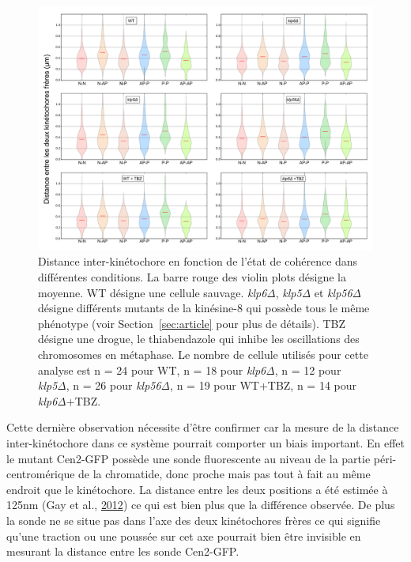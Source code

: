 \documentclass[12pt,a4paper,twoside,openright]{book}
\begin{document}
\begin{figure}[htbp]
\centering
\includegraphics{figures/results/imaging/coherence_stretch.png}
\caption[Distance inter-kinétochore en fonction de l'état de cohérence dans différentes conditions]{\label{fig:coherence_stretch}Distance
inter-kinétochore en fonction de l'état de cohérence dans différentes
conditions. La barre rouge des violin plots désigne la moyenne. WT
désigne une cellule sauvage. \emph{klp6Δ}, \emph{klp5Δ} et \emph{klp56Δ}
désigne différents mutants de la kinésine-8 qui possède tous le même
phénotype (voir Section~\ref{sec:article} pour plus de détails). TBZ
désigne une drogue, le thiabendazole qui inhibe les oscillations des
chromosomes en métaphase. Le nombre de cellule utilisés pour cette
analyse est n = 24 pour WT, n = 18 pour \emph{klp6Δ}, n = 12 pour
\emph{klp5Δ}, n = 26 pour \emph{klp56Δ}, n = 19 pour WT+TBZ, n = 14 pour
\emph{klp6Δ}+TBZ.}
\end{figure}

Cette dernière observation nécessite d'être confirmer car la mesure de
la distance inter-kinétochore dans ce système pourrait comporter un
biais important. En effet le mutant Cen2-GFP possède une sonde
fluorescente au niveau de la partie péri-centromérique de la chromatide,
donc proche mais pas tout à fait au même endroit que le kinétochore. La
distance entre les deux positions a été estimée à 125nm (Gay et al.,
\hyperref[ref-Gay2012a]{2012}) ce qui est bien plus que la différence
observée. De plus la sonde ne se situe pas dans l'axe des deux
kinétochores frères ce qui signifie qu'une traction ou une poussée sur
cet axe pourrait bien être invisible en mesurant la distance entre les
sonde Cen2-GFP.
\end{document}
